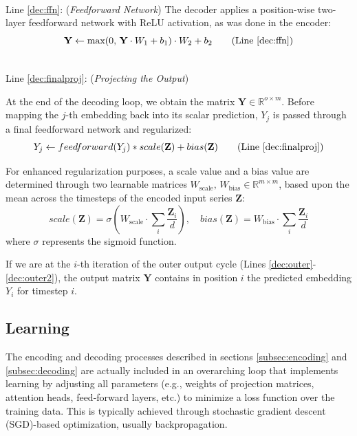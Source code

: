 \documentclass[algorithms,article,submit,pdftex,moreauthors]{Definitions/mdpi}
\begin{document}
~\\Line \ref{dec:ffn}: (\textit{Feedforward Network})
\noindent The decoder applies a position-wise two-layer feedforward network with ReLU activation, as was done in the encoder:
\begin{equation}
    \textbf{Y} \leftarrow \text{max}(0,\,\textbf{Y}\cdot W_1 + b_1) \cdot W_2 + b_2
\tag{Line \ref{dec:ffn}}
\end{equation}

~\\Line \ref{dec:finalproj}: (\textit{Projecting the Output})

\noindent At the end of the decoding loop, we obtain the matrix $\textbf{Y} \in \mathbb{R}^{o \times m}$.
Before mapping the $j$-th embedding back into its scalar prediction, $Y_j$ is passed through a final feedforward network and regularized:
\begin{equation}
    Y_j \leftarrow feedforward(Y_j) * scale(\textbf{Z}) + bias(\textbf{Z})
    \tag{Line \ref{dec:finalproj}}
\end{equation}

For enhanced regularization purposes, a scale value and a bias value are determined through two learnable matrices $W_\text{scale},\,W_\text{bias} \in \mathbb{R}^{m \times m}$, based upon the mean across the timesteps of the encoded input series $\textbf{Z}$:
$$
    scale(\textbf{Z}) = \sigma\left(W_\text{scale} \cdot \sum_{i} \dfrac{\textbf{Z}_i}{d}\right), \quad bias(\textbf{Z}) = W_\text{bias} \cdot \sum_{i} \dfrac{\textbf{Z}_i}{d}
$$
where $\sigma$ represents the sigmoid function.

If we are at the $i$-th iteration of the outer output cycle (Lines \ref{dec:outer}-\ref{dec:outer2}), the output matrix $\textbf{Y}$ contains in position $i$ the predicted embedding $Y_i$ for timestep $i$.

\subsection{Learning} \label{subsec:learning}

The encoding and decoding processes described in sections \ref{subsec:encoding} and \ref{subsec:decoding} are actually included in an overarching loop that implements learning by adjusting all parameters (e.g., weights of projection matrices, attention heads, feed-forward layers, etc.) to minimize a loss function over the training data. This is typically achieved through stochastic gradient descent (SGD)-based optimization, usually backpropagation.
\end{document}
